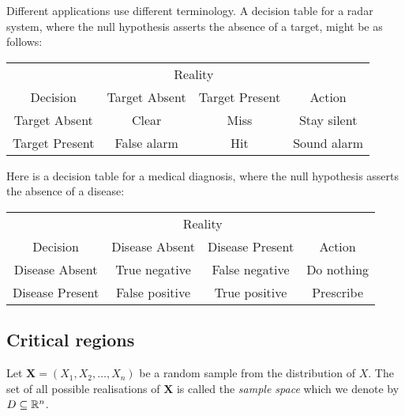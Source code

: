 %
Different applications use different terminology. A decision table for a radar system, where the null hypothesis asserts the absence of a target, might be as follows:
\begin{center}
\begin{tabular}{|c|c|c||c|} \hline
				& \multicolumn{2}{c||}{Reality} & \\
Decision		& 	Target Absent	& Target Present 	& Action\\  \hline
Target Absent	&	Clear			& Miss 				& Stay silent \\
Target Present	&	False alarm 	& Hit 				& Sound alarm \\  \hline
\end{tabular}
\end{center}
Here is a decision table for a medical diagnosis, where the null hypothesis asserts the absence of a disease:
\begin{center}
\begin{tabular}{|c|c|c||c|} \hline
				& \multicolumn{2}{c||}{Reality} &  \\
Decision		& Disease Absent	& Disease Present	& Action \\  \hline
Disease Absent	& True negative		& False negative	& Do nothing  \\
Disease Present	& False positive 	& True positive 	& Prescribe \\  \hline
\end{tabular}
\end{center}


\subsection{Critical regions}

\begin{definition}
Let $\mathbf{X}=(X_1,X_2,\ldots,X_n)$ be a random sample from the distribution of $X$. 
The set of all possible realisations of $\mathbf{X}$ is called the \emph{sample space} which we denote by $D\subseteq\mathbb{R}^n$.
\end{definition}

